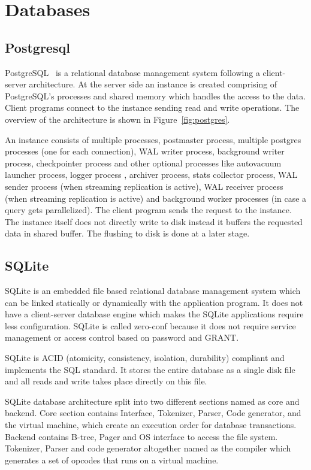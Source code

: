 \section{Databases}
\label{sec:db}

\subsection{Postgresql}

PostgreSQL~\cite{ref:pg1} is a relational database management system following a client-server architecture. At the server side an instance is created comprising of PostgreSQL's processes and shared memory which handles the access to the data. Client programs connect to the instance sending read and write operations. The overview of the architecture is shown in Figure~\ref{fig:postgres}.

An instance consists of multiple processes,  postmaster process, multiple postgres processes (one for each connection), WAL writer process, background writer process, checkpointer process and other optional processes like autovacuum launcher process, logger process , archiver process, stats collector process, WAL sender process (when streaming replication is active), WAL receiver process (when streaming replication is active) and background worker processes (in case a query gets parallelized). The client program sends the request to the instance. The instance itself does not directly write to disk instead it buffers the requested data in shared buffer. The flushing to disk is done at a later stage.

\subsection{SQLite}


SQLite is an embedded file based relational database management system which can be linked statically or dynamically with the application program. It does not have a client-server database engine which makes the SQLite applications require less configuration. SQLite is called zero-conf because it does not require service management or access control based on password and GRANT.


SQLite is ACID  (atomicity, consistency, isolation, durability) compliant and implements the SQL standard. It stores the entire database as a single disk file and all reads and write takes place directly on this file. 

SQLite database architecture split into two different sections named as core and backend. Core section contains Interface, Tokenizer, Parser, Code generator, and the virtual machine, which create an execution order for database transactions. Backend contains B-tree, Pager and OS interface to access the file system. Tokenizer, Parser and code generator altogether named as the compiler which generates a set of opcodes that runs on a virtual machine.
